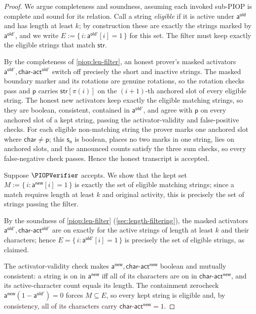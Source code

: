 \begin{proof}
We argue completeness and soundness, assuming each invoked sub-PIOP is complete and sound for its relation. Call a string \emph{eligible} if it is active under $\mathsf{a^{old}}$ and has length at least $k$; by construction these are exactly the strings marked by $\mathsf{a^{old'}}$, and we write $E := \{\,i : \mathsf{a^{old'}}[i]=1\,\}$ for this set. The filter must keep exactly the eligible strings that match $\mathsf{str}$.

By the completeness of \cref{piop:len-filter}, an honest prover's masked activators $\mathsf{a^{old'}},\mathsf{char\text{-}act^{old'}}$ switch off precisely the short and inactive strings. The masked boundary marker and its rotations are genuine rotations, so the rotation checks pass and $\mathsf{p}$ carries $\mathsf{str}[\pi(i)]$ on the $(i{+}1)$-th anchored slot of every eligible string. The honest new activators keep exactly the eligible matching strings, so they are boolean, consistent, contained in $\mathsf{a^{old'}}$, and agree with $\mathsf{p}$ on every anchored slot of a kept string, passing the activator-validity and false-positive checks. For each eligible non-matching string the prover marks one anchored slot where $\mathsf{char}\neq\mathsf{p}$; this $\mathsf{s_n}$ is boolean, places no two marks in one string, lies on anchored slots, and the announced counts satisfy the three sum checks, so every false-negative check passes. Hence the honest transcript is accepted.

Suppose $\PIOPVerifier$ accepts. We show that the kept set $M := \{\,i : \mathsf{a^{new}}[i]=1\,\}$ is exactly the set of eligible matching strings; since a match requires length at least $k$ and original activity, this is precisely the set of strings passing the filter.

By the soundness of \cref{piop:len-filter} (\cref{sec:length-filtering}), the masked activators $\mathsf{a^{old'}}, \mathsf{char\text{-}act^{old'}}$ are on exactly for the active strings of length at least $k$ and their characters; hence $E = \{\,i : \mathsf{a^{old'}}[i]=1\,\}$ is precisely the set of eligible strings, as claimed.

The activator-validity check makes $\mathsf{a^{new}},\mathsf{char\text{-}act^{new}}$ boolean and mutually consistent: a string is on in $\mathsf{a^{new}}$ iff all of its characters are on in $\mathsf{char\text{-}act^{new}}$, and its active-character count equals its length. The containment zerocheck $\mathsf{a^{new}}(1-\mathsf{a^{old'}})=0$ forces $M\subseteq E$, so every kept string is eligible and, by consistency, all of its characters carry $\mathsf{char\text{-}act^{new}}=1$.


\end{proof}
